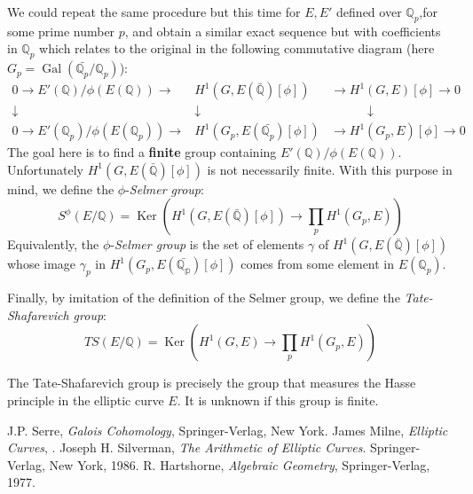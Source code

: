 \documentclass[12pt]{article}
\begin{document}
We could repeat the same procedure but this time for $E,E'$
defined over $\mathbb{Q}_p$,for some prime number $p$, and obtain
a similar exact sequence but with coefficients in $\mathbb{Q}_p$
which relates to the original in the following commutative diagram
(here $G_p=\operatorname{Gal}({\bar{\mathbb{Q}_p}/\mathbb{Q}_p})$):
\begin{eqnarray*}
0\to  E'(\mathbb{Q})/\phi(E(\mathbb{Q}))  \to
 &H^1(G,E(\bar{\mathbb{Q}})[\phi])& \to H^1(G,E)[\phi]\to 0\\
\downarrow \quad\quad\quad\quad  &\downarrow& \quad\quad\quad \downarrow \\
0\to E'(\mathbb{Q}_p)/\phi(E(\mathbb{Q}_p)) \to
&H^1(G_p,E(\bar{\mathbb{Q}_p})[\phi])& \to H^1(G_p,E)[\phi]\to 0
\end{eqnarray*}
The goal here is to find a {\bf finite} group containing
$E'(\mathbb{Q})/\phi(E(\mathbb{Q}))$. Unfortunately
$H^1(G,E(\bar{\mathbb{Q}})[\phi])$ is not necessarily finite. With
this purpose in mind, we define the $\phi$-\emph{Selmer group}:
$$S^{\phi}(E/\mathbb{Q})=\operatorname{Ker}\left(H^1(G,E(\bar{\mathbb{Q}})[\phi])\to \prod_p H^1(G_p,E)\right)$$
Equivalently, the $\phi$-\emph{Selmer group} is the set of
elements $\gamma$ of $H^1(G,E(\bar{\mathbb{Q}})[\phi])$ whose
image $\gamma_p$ in $H^1(G_p,E(\bar{\mathbb{Q_p}})[\phi])$ comes
from some element in $E(\mathbb{Q}_p)$.

Finally, by imitation of the definition of the Selmer group, we
define the \emph{Tate-Shafarevich group}:
$$TS(E/\mathbb{Q})=\operatorname{Ker}\left(H^1(G,E)\to \prod_p H^1(G_p,E)\right)$$

The Tate-Shafarevich group is precisely the group that measures
the Hasse principle in the elliptic curve $E$. It is unknown if
this group is finite.

\begin{thebibliography}{9}
 J.P. Serre, {\em Galois Cohomology},
Springer-Verlag, New York.
 James Milne, {\em Elliptic Curves}, .
 Joseph H. Silverman, {\em The Arithmetic of Elliptic Curves}. Springer-Verlag, New York, 1986.
 R. Hartshorne, {\em Algebraic Geometry},
Springer-Verlag, 1977.
\end{thebibliography}
\end{document}
